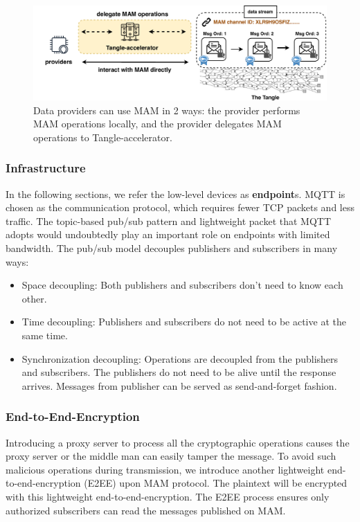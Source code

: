 \documentclass[conference]{IEEEtran}
\begin{document}
\begin{figure}[!t]
    \centering
    \includegraphics[width=\linewidth]{delegation}
    \caption{Data providers can use MAM in 2 ways: the provider performs MAM operations locally, and the provider delegates MAM operations to Tangle-accelerator.}
    \label{fig:delegation}
\end{figure}


\subsubsection{Infrastructure}
In the following sections, we refer the low-level devices as \textbf{endpoint}s. MQTT\cite{MQTT} is chosen as the communication protocol, which requires fewer TCP packets and less traffic. The topic-based pub/sub pattern and lightweight packet that MQTT adopts would undoubtedly play an important role on endpoints with limited bandwidth. The pub/sub model decouples publishers and subscribers in many ways:

\begin{itemize}
    \item Space decoupling: Both publishers and subscribers don't need to know each other.
    \item Time decoupling: Publishers and subscribers do not need to be active at the same time.
    \item Synchronization decoupling: Operations are decoupled from the publishers and subscribers. The publishers do not need to be alive until the response arrives. Messages from publisher can be served as send-and-forget fashion.
\end{itemize}

\subsubsection{End-to-End-Encryption}
Introducing a proxy server to process all the cryptographic operations causes the proxy server or the middle man can easily tamper the message. To avoid such malicious operations during transmission, we introduce another lightweight end-to-end-encryption (E2EE) upon MAM protocol. The plaintext will be encrypted with this lightweight end-to-end-encryption. The E2EE process ensures only authorized subscribers can read the messages published on MAM.
\end{document}
